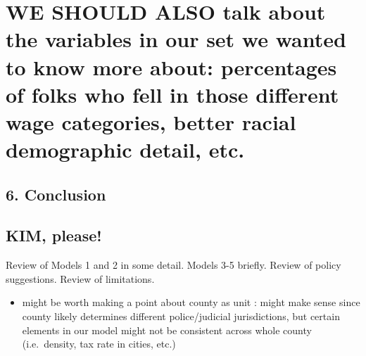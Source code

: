 \documentclass[]{article}
\providecommand{\tightlist}{%
  \setlength{\itemsep}{0pt}\setlength{\parskip}{0pt}}
\begin{document}
\section{WE SHOULD ALSO talk about the variables in our set we wanted to
know more about: percentages of folks who fell in those different wage
categories, better racial demographic detail,
etc.}\label{we-should-also-talk-about-the-variables-in-our-set-we-wanted-to-know-more-about-percentages-of-folks-who-fell-in-those-different-wage-categories-better-racial-demographic-detail-etc.}

\subsection{6. Conclusion}\label{conclusion}

\subsection{KIM, please!}\label{kim-please}

Review of Models 1 and 2 in some detail. Models 3-5 briefly. Review of
policy suggestions. Review of limitations.

\begin{itemize}
\tightlist
\item
  might be worth making a point about county as unit : might make sense
  since county likely determines different police/judicial
  jurisdictions, but certain elements in our model might not be
  consistent across whole county (i.e.~density, tax rate in cities,
  etc.)
\end{itemize}
\end{document}
